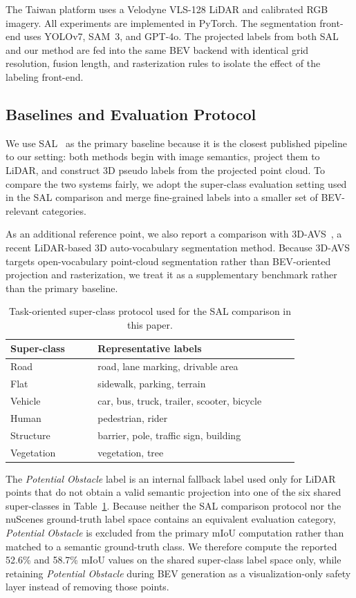 \documentclass[conference]{IEEEtran}
\begin{document}
The Taiwan platform uses a Velodyne VLS-128 LiDAR and calibrated RGB imagery. All experiments are implemented in PyTorch. The segmentation front-end uses YOLOv7, SAM~3, and GPT-4o. The projected labels from both SAL and our method are fed into the same BEV backend with identical grid resolution, fusion length, and rasterization rules to isolate the effect of the labeling front-end.

\subsection{Baselines and Evaluation Protocol}
We use SAL~\cite{sal} as the primary baseline because it is the closest published pipeline to our setting: both methods begin with image semantics, project them to LiDAR, and construct 3D pseudo labels from the projected point cloud. To compare the two systems fairly, we adopt the super-class evaluation setting used in the SAL comparison and merge fine-grained labels into a smaller set of BEV-relevant categories.

As an additional reference point, we also report a comparison with 3D-AVS~\cite{three_d_avs}, a recent LiDAR-based 3D auto-vocabulary segmentation method. Because 3D-AVS targets open-vocabulary point-cloud segmentation rather than BEV-oriented projection and rasterization, we treat it as a supplementary benchmark rather than the primary baseline.

\begin{table}[t]
  \caption{Task-oriented super-class protocol used for the SAL comparison in this paper.}
  \label{tab:label-protocol}
  \centering
  \footnotesize
  \begin{tabular}{p{0.26\linewidth}p{0.60\linewidth}}
    \toprule
    Super-class & Representative labels \\
    \midrule
    Road & road, lane marking, drivable area \\
    Flat & sidewalk, parking, terrain \\
    Vehicle & car, bus, truck, trailer, scooter, bicycle \\
    Human & pedestrian, rider \\
    Structure & barrier, pole, traffic sign, building \\
    Vegetation & vegetation, tree \\
    \bottomrule
  \end{tabular}
\end{table}

The \emph{Potential Obstacle} label is an internal fallback label used only for LiDAR points that do not obtain a valid semantic projection into one of the six shared super-classes in Table~\ref{tab:label-protocol}. Because neither the SAL comparison protocol nor the nuScenes ground-truth label space contains an equivalent evaluation category, \emph{Potential Obstacle} is excluded from the primary mIoU computation rather than matched to a semantic ground-truth class. We therefore compute the reported 52.6\% and 58.7\% mIoU values on the shared super-class label space only, while retaining \emph{Potential Obstacle} during BEV generation as a visualization-only safety layer instead of removing those points.
\end{document}
